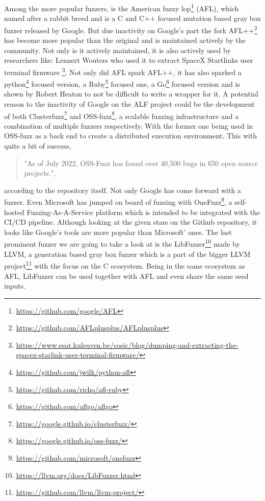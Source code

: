 Among the more popular fuzzers, is the American fuzzy lop\footnote{\url{https://github.com/google/AFL}} (AFL), which named after a rabbit breed and is a C and C++ focused mutation based gray box fuzzer released by Google. But due inactivity on Google's part the fork AFL++\footnote{\url{https://github.com/AFLplusplus/AFLplusplus}} has become more popular than the original and is maintained actively by the community\cite{27AFL++}. Not only is it actively maintained, it is also actively used by researchers like: Lennert Wouters who used it to extract SpaceX Startlinks user terminal firmware \footnote{\url{https://www.esat.kuleuven.be/cosic/blog/dumping-and-extracting-the-spacex-starlink-user-terminal-firmware/}}. 
Not only did AFL spark AFL++, it has also sparked a python\footnote{\url{https://github.com/jwilk/python-afl}} focused version, a Ruby\footnote{\url{https://github.com/richo/afl-ruby}} focused one, a Go\footnote{\url{https://github.com/aflgo/aflgo}} focused version and is shown by Robert Heaton\cite{AFLWrapper} to not be difficult to write a wrapper for it. A potential reason to the inactivity of Google on the ALF project could be the development of both Clusterfuzz\footnote{\url{https://google.github.io/clusterfuzz/}} and OSS-fuzz\footnote{\url{https://google.github.io/oss-fuzz/}}, a scalable fuzzing infrastructure and a combination of multiple fuzzers respectively. With the former one being used in OSS-fuzz as a back end to create a distributed execution environment. This with quite a bit of success\cite{31OSS-FuzzBugs},
\begin{quote} 
	"As of July 2022, OSS-Fuzz has found over 40,500 bugs in 650 open source projects.",
\end{quote} according to the repository itself. 
Not only Google has come forward with a fuzzer. Even Microsoft has jumped on board of fuzzing with OneFuzz\footnote{\url{https://github.com/microsoft/onefuzz}}, a self-hosted Fuzzing-As-A-Service platform which is intended to be integrated with the CI/CD pipeline. Although looking at the given stars on the Github repository, it looks like Google's tools are more popular than Microsoft' ones.
The last prominent fuzzer we are going to take a look at is the LibFuzzer\footnote{\url{https://llvm.org/docs/LibFuzzer.html}} made by LLVM, a generation based gray box fuzzer which is a part of the bigger LLVM project\footnote{\url{https://github.com/llvm/llvm-project/}} with the focus on the C ecosystem. Being in the same ecosystem as AFL, LibFuzzer can be used together with AFL and even share the same seed inputs.

